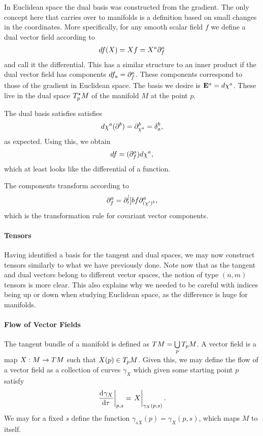 In Euclidean space the dual basis was constructed from the gradient. The only concept here that carries over to manifolds is a definition based on small changes in the coordinates. More specifically, for any smooth scalar field $f$ we define a dual vector field according to
\begin{align*}
df(X) = Xf = X^{a}\partial^{a}_{f}
\end{align*}
and call it the differential. This has a similar structure to an inner product if the dual vector field has components $df_{a} = \partial^{a}_{f}$. These components correspond to those of the gradient in Euclidean space. The basis we desire is $\vb{E}^{a} = d\chi^{a}$. These live in the dual space $T_{p}^{\star}M$ of the manifold $M$ at the point $p$.

The dual basis satisfies satisfies
\begin{align*}
d\chi^{a}(\del{b}{}) = \del{b}{\chi^{a}} = \kdelta{b}{a},
\end{align*}
as expected. Using this, we obtain
\begin{align*}
df = (\partial^{a}_{f})d\chi^{a},
\end{align*}
which at least looks like the differential of a function.

The components transform according to
\begin{align*}
\partial^{a}_{f} = \partial^{[}_{\prime}]{b}{f}\partial^{a}_{(\chi^{\prime})^{b}},
\end{align*}
which is the transformation rule for covariant vector components.

\paragraph{Tensors}
Having identified a basis for the tangent and dual spaces, we may now construct tensors similarly to what we have previously done. Note now that as the tangent and dual vectors belong to different vector spaces, the notion of type $(n, m)$ tensors is more clear. This also explains why we needed to be careful with indices being up or down when studying Euclidean space, as the difference is huge for manifolds.

\paragraph{Flow of Vector Fields}
The tangent bundle of a manifold is defined as $TM = \bigcup\limits_{p}T_{p}M$. A vector field is a map $X: M\to TM$ such that $X(p)\in T_{p}M$. Given this, we may define the flow of a vector field as a collection of curves $\gamma_{X}$ which given some starting point $p$ satisfy
\begin{align*}
\deval{\gamma_{X}}{\tau}{p, s} = \eval{X}_{\gamma_{X}(p, s)}.
\end{align*}
We may for a fixed $s$ define the function $\gamma_{sX}(p) = \gamma_{X}(p, s)$, which maps $M$ to itself.


